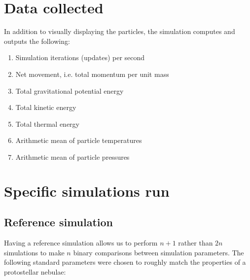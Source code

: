 \documentclass[../main.tex]{subfiles}
\begin{document}
\section{Data collected}
In addition to visually displaying the particles, the simulation computes and outputs the following:
\begin{enumerate}
    \item Simulation iterations (updates) per second
    \item Net movement, i.e. total momentum per unit mass
    \item Total gravitational potential energy
    \item Total kinetic energy
    \item Total thermal energy
    \item Arithmetic mean of particle temperatures
    \item Arithmetic mean of particle pressures
\end{enumerate}

\section{Specific simulations run}

\subsection{Reference simulation}
Having a reference simulation allows us to perform $n+1$ rather than $2n$ simulations to make $n$
binary comparisons between simulation parameters. The following standard parameters were chosen to
roughly match the properties of a protostellar nebulae:
\\
\end{document}
